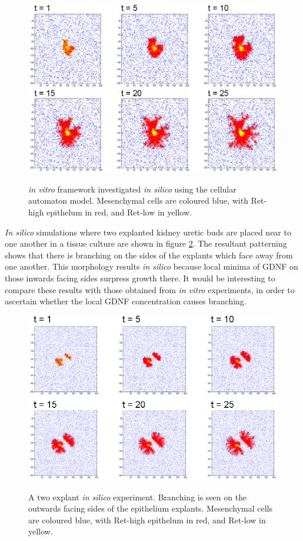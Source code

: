 \documentclass[pdftex,10pt,a4paper,twocolumn]{article}
\begin{document}
\begin{figure}[t] 
\centering
\scalebox{1.0} 
{\includegraphics{invitro_emerge.eps}}
\caption{\textit{in vitro} framework investigated \textit{in silico} using the cellular automaton model. Mesenchymal cells are coloured blue, with Ret-high epithelum in red, and Ret-low in yellow.}\label{fig:invitro_emerge}
\end{figure} 

\textit{In silico} simulations where two explanted kidney uretic buds are placed near to one another in a tissue culture are shown in figure \ref{fig:duo}. The resultant patterning shows that there is branching on the sides of the explants which face away from one another. This morphology results \textit{in silico} because local minima of GDNF on those inwards facing sides surpress growth there. It would be interesting to compare these results with those obtained from \textit{in vitro} experiments, in order to ascertain whether the local GDNF concentration causes branching.

\begin{figure}[t] 
\centering
\scalebox{1.0} 
{\includegraphics{duo.eps}}
\caption{A two explant \textit{in silico} experiment. Branching is seen on the outwards facing sides of the epithelium explants. Mesenchymal cells are coloured blue, with Ret-high epithelum in red, and Ret-low in yellow.}\label{fig:duo}
\end{figure} 
\end{document}
